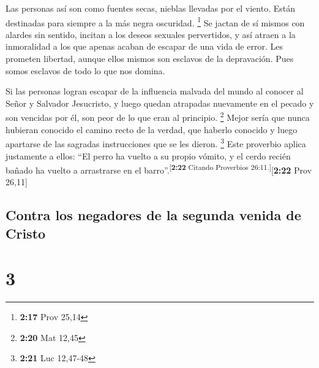  Las personas así son como fuentes secas, nieblas
llevadas por el viento. Están destinadas para siempre a la más negra
oscuridad. \footnote{\textbf{2:17} Prov 25,14}  Se jactan
de sí mismos con alardes sin sentido, incitan a los deseos sexuales
pervertidos, y así atraen a la inmoralidad a los que apenas acaban de
escapar de una vida de error.  Les prometen libertad,
aunque ellos mismos son esclavos de la depravación. Pues somos esclavos
de todo lo que nos domina.

 Si las personas logran escapar de la influencia malvada
del mundo al conocer al Señor y Salvador Jesucristo, y luego quedan
atrapadas nuevamente en el pecado y son vencidas por él, son peor de lo
que eran al principio. \footnote{\textbf{2:20} Mat 12,45}
 Mejor sería que nunca hubieran conocido el camino recto
de la verdad, que haberlo conocido y luego apartarse de las sagradas
instrucciones que se les dieron. \footnote{\textbf{2:21} Luc 12,47-48}
 Este proverbio aplica justamente a ellos: ``El perro ha
vuelto a su propio vómito, y el cerdo recién bañado ha vuelto a
arrastrarse en el barro''.\textsuperscript{{[}\textbf{2:22} Citando
Proverbios 26:11.{]}}{[}\textbf{2:22} Prov 26,11{]}

\hypertarget{contra-los-negadores-de-la-segunda-venida-de-cristo}{%
\subsection{Contra los negadores de la segunda venida de
Cristo}\label{contra-los-negadores-de-la-segunda-venida-de-cristo}}

\hypertarget{section-2}{%
\section{3}\label{section-2}}

